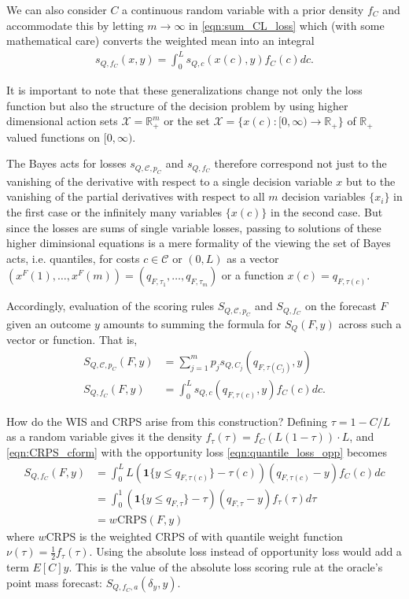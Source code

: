 \documentclass{article}
\begin{document}
We can also consider $C$ a continuous random variable with a prior density $f_C$ and accommodate this by letting $m \to \infty$ in \eqref{eqn:sum_CL_loss} 
which (with some mathematical care) converts the weighted mean into an integral
\begin{align}
s_{Q,f_C}(x,y) = \int_{0}^{L} s_{Q,c}(x(c),y) f_C(c)dc{}. \label{eqn:CRPS_loss}
\end{align}

It is important to note that these generalizations change not only the loss function but also the structure of the decision problem by using higher dimensional action sets $\mathcal{X}= \mathbb{R}_+^m$ or the set $\mathcal{X} = \{x(c):[0,\infty) \to \mathbb{R}_+\}$ of $\mathbb{R}_+$ valued functions on $[0,\infty)$.

The Bayes acts for losses $s_{Q,\mathcal{C}, p_C}$ and $s_{Q,f_C}$ therefore correspond not just to the vanishing of the derivative with respect to a single
decision variable $x$ but to the vanishing of the partial derivatives with respect to all $m$ decision variables $\{x_i\}$ in the first case or the infinitely many variables $\{x(c)\}$ in the second case.  But since the losses are sums of single variable losses, passing to solutions of these higher diminsional equations is a mere formality of the viewing the set of Bayes acts, i.e. quantiles, for costs $c \in \mathcal{C}$ or $(0,L)$ as a vector 
$(x^F(1),\ldots,x^F(m))=(q_{F,\tau_1},\ldots,q_{F,\tau_m})$ or a function $x(c) = q_{F,\tau(c)}$.

Accordingly, evaluation of the scoring rules $S_{Q,\mathcal{C}, p_C}$ and $S_{Q,f_C}$ on the forecast $F$ given an outcome $y$ amounts to summing the formula for $S_Q(F,y)$ across such a vector or function. That is,
\begin{align}
S_{Q,\mathcal{C}, p_C}(F,y) &= \sum_{j=1}^{m}p_js_{Q,C_j}(q_{F,\tau(C_j)},y) \\
S_{Q, f_C}(F,y) &= \int_{0}^{L} s_{Q,c}(q_{F,\tau(c)},y) f_C(c)dc. \label{eqn:CRPS_cform}
\end{align}

How do the WIS and CRPS arise from this construction? Defining $\tau = 1-C/L$ as a random variable gives it the density 
$f_{\tau}(\tau) = f_C\left(L(1-\tau)\right)\cdot L$, 
and \eqref{eqn:CRPS_cform} with the opportunity loss \eqref{eqn:quantile_loss_opp} becomes 
\begin{align} 
S_{Q, f_C}(F,y) &= \int_{0}^{L}L(\mathbf{1}\{y \leq q_{F,\tau(c)}\}-\tau(c))(q_{F,\tau(c)} - y)f_{C}(c)dc \\
&= \int_{0}^{1}(\mathbf{1}\{y \leq q_{F,\tau}\}-\tau)(q_{F,\tau} - y)f_{\tau}(\tau)d\tau \\
&= w\mathrm{CRPS}(F,y)
\end{align}
where $w$CRPS is the weighted CRPS of \cite{gneiting2011weightedScoringRules} with quantile weight function $\nu(\tau) = \frac{1}{2}f_{\tau}(\tau)$. 
Using the absolute loss instead of opportunity loss would add a term $E[C]y$. This is the value of the absolute loss scoring rule 
at the oracle's point mass forecast: $S_{Q, f_C, a}(\delta_y,y)$.
\end{document}
